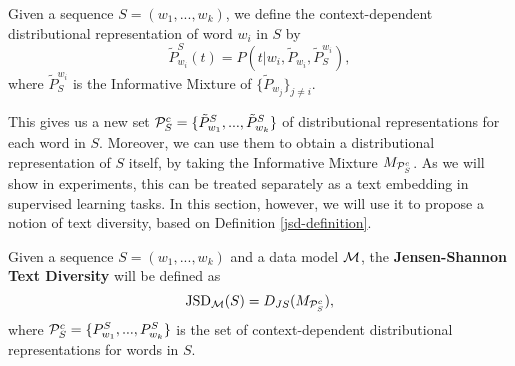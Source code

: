 \bed
Given a sequence $S=(w_1,...,w_k)$, we define the context-dependent
distributional representation of word $w_i$ in $S$ by 
\[\tilde{P}_{w_i}^S(t) = P(t|w_i,\tilde{P}_{w_i},\tilde{P}_S^{w_i}),\]
where $\tilde{P}_S^{w_i}$ is the Informative Mixture of
$\{\tilde{P}_{w_j}\}_{j\neq i}$. 
\eed

This gives us a new set ${\mathcal P}_S^c=\{\tilde{P}_{w_1}^S,...,\tilde{P}_{w_k}^S\}$ of
distributional representations for each word in $S$. Moreover, we can
use them to obtain a distributional representation of $S$ itself, by
taking the Informative Mixture $M_{{\mathcal P}_S^c}$. As we will show in
experiments, this can be treated separately as a text embedding in
supervised learning tasks. In this section, however, we will use it to
propose a notion of text diversity, based on Definition
\ref{jsd-definition}. 

\bed
Given a sequence $S=(w_1,...,w_k)$ and a data model ${\mathcal M}$, the
{\bf Jensen-Shannon Text Diversity} will be defined as
\[\textrm{JSD}_{{\mathcal M}}(S) = D_{JS}(M_{{\mathcal P}_S^c}),\] where ${\mathcal P}^c_S=\{P_{w_1}^S,...,P_{w_k}^S\}$ is the set
of context-dependent distributional representations for words in $S$. 
\eed







